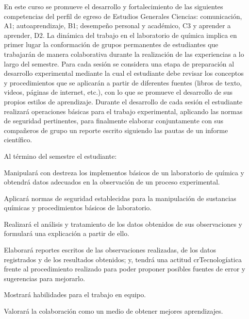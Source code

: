 \begin{syllabus}


\begin{justification}
En este curso se promueve el desarrollo y fortalecimiento de las siguientes competencias del perfil de egreso de Estudios Generales Ciencias: comunicación, A1; autoaprendizaje, B1; desempeño personal y académico, C3 y aprender a aprender, D2. La dinámica del trabajo en el laboratorio de química implica en primer lugar la conformación de grupos permanentes de estudiantes que trabajarán de manera colaborativa durante la realización de las experiencias a lo largo del semestre. Para cada sesión se considera una etapa de preparación al desarrollo experimental mediante la cual el estudiante debe revisar los conceptos y procedimientos que se aplicarán a partir de diferentes fuentes (libros de texto, videos, páginas de internet, etc.), con lo que se promueve el desarrollo de sus propios estilos de aprendizaje. Durante el desarrollo de cada sesión el estudiante realizará operaciones básicas para el trabajo experimental, aplicando las normas de seguridad pertinentes, para finalmente elaborar conjuntamente con sus compañeros de grupo un reporte escrito siguiendo las pautas de un informe científico.

Al término del semestre el estudiante:
\end{justification}

\begin{goals}

\item Manipulará con destreza los implementos básicos de un laboratorio de química y obtendrá datos adecuados en la observación de un proceso experimental. 
\item Aplicará normas de seguridad establecidas para la manipulación de sustancias químicas y procedimientos básicos de laboratorio.
\item Realizará el análisis y tratamiento de los datos obtenidos de sus observaciones y formulará una explicación a partir de ello.
\item Elaborará reportes escritos de las observaciones realizadas, de los datos registrados y de los resultados obtenidos; y, tendrá una actitud crTecnologíatica frente al procedimiento realizado para poder proponer posibles fuentes de error y sugerencias para mejorarlo. 
\item Mostrará habilidades para el trabajo en equipo.
\item Valorará la colaboración como un medio de obtener mejores aprendizajes.
\end{goals}


\end{syllabus}
